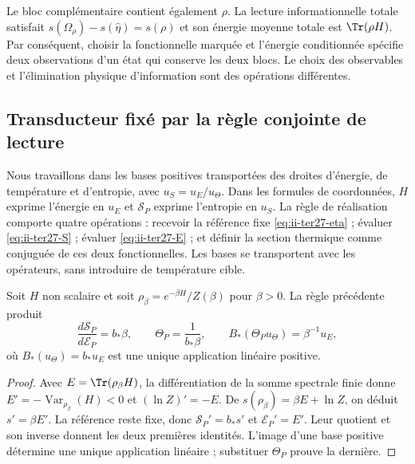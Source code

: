 Le bloc complémentaire contient également $\rho$. La lecture informationnelle
totale satisfait $s(\Omega_\rho)-s(\widehat\eta)=s(\rho)$ et son
énergie moyenne totale est $\Tr(\rho H)$. Par conséquent, choisir la fonctionnelle
marquée et l’énergie conditionnée spécifie deux observations d’un état
qui conserve les deux blocs. Le choix des observables et l’élimination
physique d’information sont des opérations différentes.

\subsection{Transducteur fixé par la règle conjointe de lecture}
\label{subsec:ii-ter27-transducer}

Nous travaillons dans les bases positives transportées des droites d’énergie,
de température et d’entropie, avec $u_S=u_E/u_\Theta$. Dans les formules de
coordonnées, $H$ exprime l’énergie en $u_E$ et $\mathcal S_P$ exprime
l’entropie en $u_S$. La règle de réalisation comporte quatre opérations :
recevoir la référence fixe \eqref{eq:ii-ter27-eta} ; évaluer
\eqref{eq:ii-ter27-S} ; évaluer \eqref{eq:ii-ter27-E} ; et définir la
section thermique comme conjuguée de ces deux fonctionnelles. Les bases se
transportent avec les opérateurs, sans introduire de température cible.

\begin{theorem}
\label{thm:ii-ter27-transducer}
Soit $H$ non scalaire et soit
$\rho_\beta=e^{-\beta H}/Z(\beta)$ pour $\beta>0$. La règle précédente
produit
\begin{equation}
 \frac{d\mathcal S_P}{d\mathcal E_P}=b_*\beta,
 \qquad \Theta_P=\frac1{b_*\beta},\qquad
 B_*(\Theta_Pu_\Theta)=\beta^{-1}u_E,
 \label{eq:ii-ter27-transducer}
\end{equation}
où $B_*(u_\Theta)=b_*u_E$ est une unique application linéaire positive.
\end{theorem}
\begin{proof}
Avec $E=\Tr(\rho_\beta H)$, la différentiation de la somme spectrale
finie donne $E'=-\operatorname{Var}_{\rho_\beta}(H)<0$ et
$(\ln Z)'=-E$. De $s(\rho_\beta)=\beta E+\ln Z$, on déduit
$s'=\beta E'$. La référence reste fixe, donc
$\mathcal S_P'=b_*s'$ et $\mathcal E_P'=E'$. Leur quotient et son
inverse donnent les deux premières identités. L’image d’une base positive
détermine une unique application linéaire ; substituer $\Theta_P$ prouve la dernière.
\end{proof}

